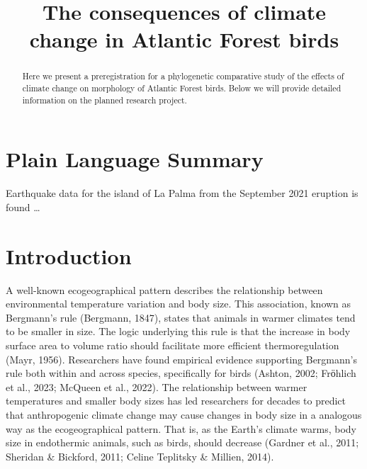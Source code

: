 \documentclass[
]{agujournal2019}
\begin{document}
\title{The consequences of climate change in Atlantic Forest birds}



\begin{abstract}
Here we present a preregistration for a phylogenetic comparative study
of the effects of climate change on morphology of Atlantic Forest birds.
Below we will provide detailed information on the planned research
project.
\end{abstract}

\section*{Plain Language Summary}
Earthquake data for the island of La Palma from the September 2021
eruption is found \ldots{}




\section{Introduction}\label{introduction}

A well-known ecogeographical pattern describes the relationship between
environmental temperature variation and body size. This association,
known as Bergmann's rule (Bergmann, 1847), states that animals in warmer
climates tend to be smaller in size. The logic underlying this rule is
that the increase in body surface area to volume ratio should facilitate
more efficient thermoregulation (Mayr, 1956). Researchers have found
empirical evidence supporting Bergmann's rule both within and across
species, specifically for birds (Ashton, 2002; Frӧhlich et al., 2023;
McQueen et al., 2022). The relationship between warmer temperatures and
smaller body sizes has led researchers for decades to predict that
anthropogenic climate change may cause changes in body size in a
analogous way as the ecogeographical pattern. That is, as the Earth's
climate warms, body size in endothermic animals, such as birds, should
decrease (Gardner et al., 2011; Sheridan \& Bickford, 2011; Celine
Teplitsky \& Millien, 2014).
\end{document}
